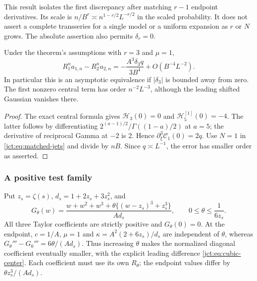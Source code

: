 This result isolates the first discrepancy after matching $r-1$
endpoint derivatives. Its scale is $n/B^r\asymp
n^{1-r/2}L^{-r/2}$ in the scaled probability. It does not assert a
complete transseries for a single model or a uniform expansion as $r$
or $N$ grows. The absolute assertion also permits $\delta_r=0$.

\begin{corollary}
\label{jct:cor:cubic-center}
Under the theorem's assumptions with $r=3$ and $\mu=1$,
\begin{equation}\label{jct:eq:cubic-center}
 R_1^n a_{1,n}-R_2^n a_{2,n}
 =-\frac{A^3\delta_3 q}{3B^4}
       +O(B^{-4}L^{-2}).
\end{equation}
In particular this is an asymptotic equivalence if $|\delta_3|$ is
bounded away from zero. The first nonzero central term has order
$n^{-2}L^{-3}$, although the leading shifted Gaussian vanishes there.
\end{corollary}

\begin{proof}
The exact central formula gives
$\mathcal{H}_3(0)=0$ and $\mathcal{H}_5^{[1]}(0)=-4$.
The latter follows by differentiating
$2^{(a-1)/2}/\Gamma((1-a)/2)$ at $a=5$; the derivative of reciprocal
Gamma at $-2$ is $2$. Hence
$\partial_\xi^3\mathcal C_1(0)=2q$.
Use $N=1$ in \eqref{jct:eq:matched-jets} and divide by $nB$.
Since $q\asymp L^{-1}$, the error has smaller order as asserted.
\end{proof}

\subsubsection{A positive test family}
Put $z_s=\zeta(s)$, $d_s=1+2z_s+3z_s^2$, and
\begin{equation}\label{jct:eq:positive-cubic-family}
 G_\theta(w)=\frac{w+w^2+w^3+
               \theta\{(w-z_s)^3+z_s^3\}}{A d_s},
 \qquad 0\le\theta\le\frac1{6z_s}.
\end{equation}
All three Taylor coefficients are strictly positive and $G_\theta(0)=0$.
At the endpoint, $c=1/A$, $\mu=1$ and
$\kappa=A^2(2+6z_s)/d_s$ are independent of $\theta$, whereas
$G_\theta'''-G_0'''=6\theta/(A d_s)$.
Thus increasing $\theta$ makes the normalized diagonal coefficient
eventually smaller, with the explicit leading difference
\eqref{jct:eq:cubic-center}. Each coefficient must use its own $R_\theta$;
the endpoint values differ by $\theta z_s^3/(A d_s)$.

